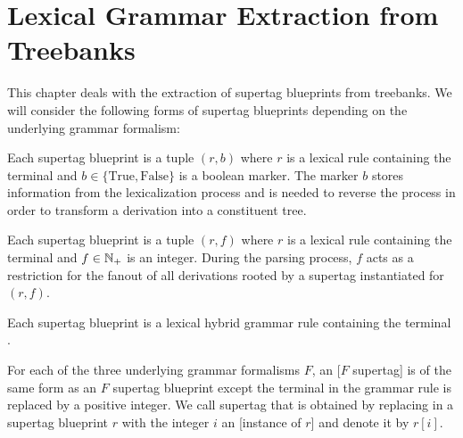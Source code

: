 \documentclass[../document.tex]{subfiles}
\begin{document}
    \chapter{Lexical Grammar Extraction from Treebanks}
    This chapter deals with the extraction of supertag blueprints from treebanks.
    We will consider the following forms of supertag blueprints depending on the underlying grammar formalism:
    \begin{compactenum}
        \item
            Each  supertag blueprint is a tuple \((r, b)\) where \(r\) is a lexical  rule containing the terminal \wildcard{} and \(b \in \{\text{True}, \text{False}\}\) is a boolean marker.
            The marker \(b\) stores information from the lexicalization process and is needed to reverse the process in order to transform a derivation into a constituent tree.
        \item
            Each  supertag blueprint is a tuple \((r, f)\) where \(r\) is a lexical  rule containing the terminal \wildcard{} and \(f \in \mathbb{N}_+\) is an integer.
            During the parsing process, \(f\) acts as a restriction for the fanout of all derivations rooted by a supertag instantiated for \((r,f)\).
        \item Each  supertag blueprint is a lexical hybrid grammar rule containing the terminal \wildcard{}.
    \end{compactenum}
    For each of the three underlying grammar formalisms \(F\), an [\(F\) supertag] is of the same form as an \(F\) supertag blueprint except the terminal \wildcard{} in the grammar rule is replaced by a positive integer.
    We call supertag that is obtained by replacing \wildcard{} in a supertag blueprint \(r\) with the integer \(i\) an [instance of \(r\)] and denote it by \(r[i]\).
\end{document}
